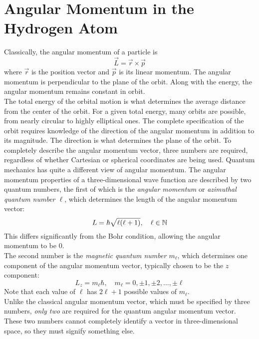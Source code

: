 \documentclass{subfiles}
\begin{document}
	\section{Angular Momentum in the Hydrogen Atom}
			Classically, the angular momentum of a particle is
				\[
					\vec{L} = \vec{r} \times \vec{p}
						\tag{classical angular momentum}
				\]
				where \(\vec{r}\) is the position vector and \(\vec{p}\) is its linear momentum. The angular momentum is perpendicular to the plane of the orbit. Along with the energy, the angular momentum remains constant in orbit. \\
			The total energy of the orbital motion is what determines the average distance from the center of the orbit. For a given total energy, many orbits are possible, from nearly circular to highly elliptical ones. The complete specification of the orbit requires knowledge of the direction of the angular momentum in addition to its magnitude. The direction is what determines the plane of the orbit. To completely describe the angular momentum vector, three numbers are required, regardless of whether Cartesian or spherical coordinates are being used.
			Quantum mechanics has quite a different view of angular momentum. The angular momentum properties of a three-dimensional wave function are described by two quantum numbers, the first of which is the \textit{angular momentum} or \textit{azimuthal quantum number \(\ell\)}, which determines the length of the angular momentum vector:
				\[
					L = \hbar\sqrt{\ell(\ell + 1)}
						, \quad \ell \in \mathbb{N}
				\]
				This differs significantly from the Bohr condition, allowing the angular momentum to be 0. \\
				The second number is the \textit{magnetic quantum number \(m_\ell\)}, which determines one component of the angular momentum vector, typically chosen to be the \(z\) component:
				\[
					L_z = m_\ell\hbar, \quad
						m_\ell = 0, \pm 1, \pm 2, \ldots, \pm \ell
				\]
				Note that each value of \(\ell\) has \(2\ell + 1\) possible values of \(m_\ell\). \\
				Unlike the classical angular momentum vector, which must be specified by three numbers, \textit{only two} are required for the quantum angular momentum vector. These two numbers cannot completely identify a vector in three-dimensional space, so they must signify something else. \\
\end{document}
